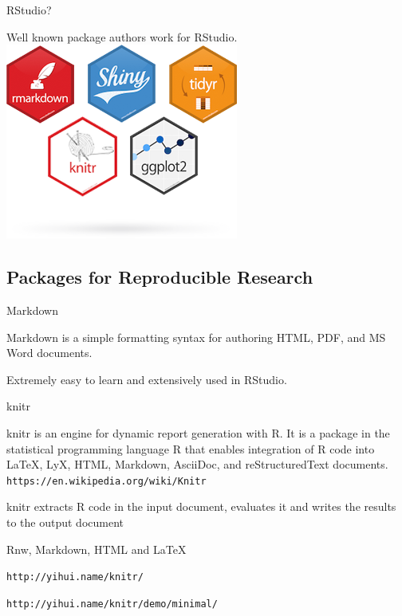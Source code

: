 \documentclass{beamer}
\begin{document}

\begin{frame}{RStudio?} %

Well known package authors work for RStudio.
\includegraphics[height=.50\textwidth]{figs/r-packages.png}


\end{frame}



\subsection[Packages]{Packages for Reproducible Research}


\begin{frame}{Markdown} %

Markdown is a simple formatting syntax for authoring HTML, PDF, and MS Word documents. 

Extremely easy to learn and extensively used in RStudio.

\end{frame}


\begin{frame}{knitr} %

knitr is an engine for dynamic report generation with R. It is a package in the statistical programming language R that enables integration of R code into LaTeX, LyX, HTML, Markdown, AsciiDoc, and reStructuredText documents.
\texttt{https://en.wikipedia.org/wiki/Knitr}

knitr extracts R code in the input document, evaluates it and writes the results to the output document

Rnw, Markdown, HTML and LaTeX

\texttt{http://yihui.name/knitr/}

\texttt{http://yihui.name/knitr/demo/minimal/}


\end{frame}
\end{document}
